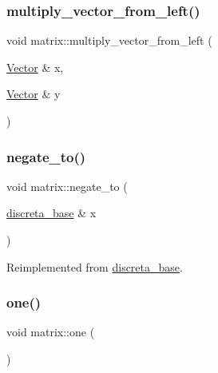 \mbox{\label{classmatrix_ae578f93fd93c59b9755d31b5fd11e14c}} 
\subsubsection{\texorpdfstring{multiply\+\_\+vector\+\_\+from\+\_\+left()}{multiply\_vector\_from\_left()}}
{\footnotesize\ttfamily void matrix\+::multiply\+\_\+vector\+\_\+from\+\_\+left (\begin{DoxyParamCaption}\item[{\mbox{\hyperlink{class_vector}{Vector}} \&}]{x,  }\item[{\mbox{\hyperlink{class_vector}{Vector}} \&}]{y }\end{DoxyParamCaption})}

\mbox{\label{classmatrix_acb93b95943eee2253b7b3b799333a24c}} 
\subsubsection{\texorpdfstring{negate\+\_\+to()}{negate\_to()}}
{\footnotesize\ttfamily void matrix\+::negate\+\_\+to (\begin{DoxyParamCaption}\item[{\mbox{\hyperlink{classdiscreta__base}{discreta\+\_\+base}} \&}]{x }\end{DoxyParamCaption})\hspace{0.3cm}{\ttfamily [virtual]}}



Reimplemented from \mbox{\hyperlink{classdiscreta__base_a65ad2034f2f4518d424b814974018a03}{discreta\+\_\+base}}.

\mbox{\label{classmatrix_a780b461503be22827c4fdca66f779be1}} 
\subsubsection{\texorpdfstring{one()}{one()}}
{\footnotesize\ttfamily void matrix\+::one (\begin{DoxyParamCaption}{ }\end{DoxyParamCaption})\hspace{0.3cm}{\ttfamily [virtual]}}



